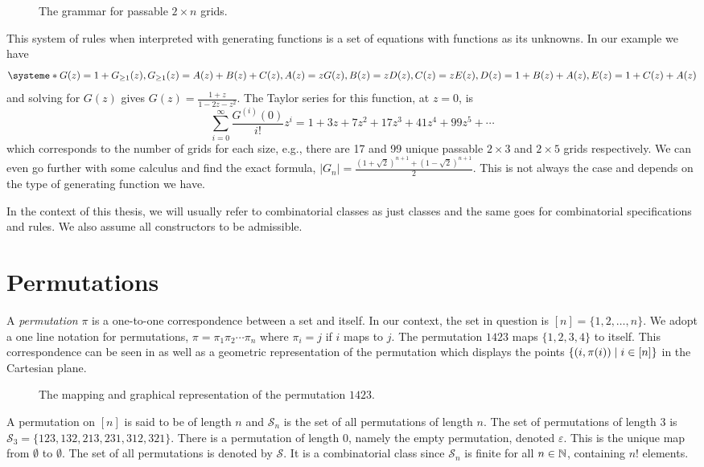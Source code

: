 \begin{figure}[ht!]
    \centering
    
    \caption{The grammar for passable $2\times n$ grids.}
    \label{fig:gridtree}
\end{figure}

This system of rules when interpreted with generating functions is a set of equations with functions as its unknowns. In our example we have
\[
    \systeme*{G(z) = 1 + G_{\geq1}(z), G_{\geq1}(z) = A(z) + B(z) + C(z),A(z) = zG(z), B(z) = zD(z), C(z) = zE(z), D(z) = 1+B(z)+A(z), E(z) = 1+C(z)+A(z)}
\]
and solving for $G(z)$ gives $G(z) = \frac{1+z}{1-2z-z^2}$. The Taylor series for this function, at $z=0$, is
\[
    \sum_{i=0}^\infty \frac{G^{(i)}(0)}{i!}z^i = 1+3z+7z^2+17z^3+ 41z^4 + 99z^5 + \dotsm
\]
which corresponds to the number of grids for each size, e.g., there are 17 and 99 unique passable $2\times3$ and $2\times5$ grids respectively. We can even go further with some calculus and find the exact formula, $|G_n| = \frac{\left(1+\sqrt{2}\right)^{n+1} + \left(1-\sqrt{2}\right)^{n+1}}{2}$. This is not always the case and depends on the type of generating function we have.

In the context of this thesis, we will usually refer to combinatorial classes as just classes and the same goes for combinatorial specifications and rules. We also assume all constructors to be admissible.

\section{Permutations\label{sec:permutations}}
A \emph{permutation} $\pi$ is a one-to-one correspondence between a set and itself. In our context, the set in question is $[n] = \{1,2,\dotsc,n\}$. We adopt a one line notation for permutations, $\pi = \pi_1 \pi_2 \dotsm \pi_n$ where $\pi_i = j$ if $i$ maps to $j$. The permutation $1423$ maps $\{1,2,3,4\}$ to itself. This correspondence can be seen in  as well as a geometric representation of the permutation which displays the points $\left\{(i,\pi(i)) \mid i \in [n]\right\}$ in the Cartesian plane.

\begin{figure}[ht!]
    \centering
    
    \caption{The mapping and graphical representation of the permutation $1423$.}
    \label{fig:perm_example}
\end{figure}

A permutation on $[n]$ is said to be of length $n$ and $\mathcal{S}_n$ is the set of all permutations of length $n$. The set of permutations of length 3 is $\mathcal{S}_3 = \{123,132,213,231,312,321\}$. There is a permutation of length $0$, namely the empty permutation, denoted $\varepsilon$. This is the unique map from $\emptyset$ to $\emptyset$. The set of all permutations is denoted by $\mathcal{S}$. It is a combinatorial class since $\mathcal{S}_n$ is finite for all $n\in\mathbb{N}$, containing $n!$ elements.

